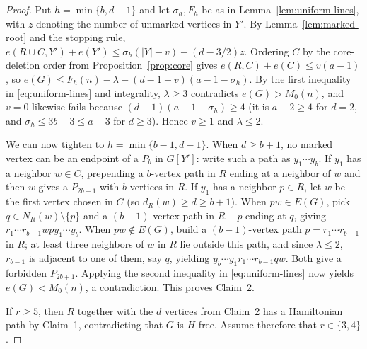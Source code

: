 \documentclass[10pt]{article}
\theoremstyle{compactplain}
\theoremstyle{remark}\newtheorem{remark}[theorem]{Remark}
\begin{document}
\begin{proof}
Put $h=\min\{b,d-1\}$ and let $\sigma_h,F_h$ be as in
Lemma~\ref{lem:uniform-lines}, with $z$ denoting the number of unmarked
vertices in $Y'$. By Lemma~\ref{lem:marked-root} and the stopping rule,
$e(R\cup C,Y')+e(Y')\le\sigma_h(|Y|-v)-(d-3/2)z$. Ordering $C$ by the
core-deletion order from Proposition~\ref{prop:core} gives
$e(R,C)+e(C)\le v(a-1)$, so
$e(G)\le F_h(n)-\lambda-(d-1-v)(a-1-\sigma_h)$. By the first inequality
in \eqref{eq:uniform-lines} and integrality, $\lambda\ge3$ contradicts
$e(G)>M_0(n)$, and $v=0$ likewise fails because
$(d-1)(a-1-\sigma_h)\ge4$ (it is $a-2\ge4$ for $d=2$, and
$\sigma_h\le3b-3\le a-3$ for $d\ge3$). Hence $v\ge1$ and $\lambda\le2$.

We can now tighten to $h=\min\{b-1,d-1\}$. When $d\ge b+1$, no marked
vertex can be an endpoint of a $P_b$ in $G[Y']$: write such a path as
$y_1\cdots y_b$. If $y_1$ has a neighbor $w\in C$, prepending a
$b$-vertex path in $R$ ending at a neighbor of $w$ and then $w$ gives a
$P_{2b+1}$ with $b$ vertices in $R$. If $y_1$ has a neighbor $p\in R$,
let $w$ be the first vertex chosen in $C$ (so $d_R(w)\ge d\ge b+1$).
When $pw\in E(G)$, pick $q\in N_R(w)\setminus\{p\}$ and a $(b-1)$-vertex
path in $R-p$ ending at $q$, giving $r_1\cdots r_{b-1}wpy_1\cdots y_b$.
When $pw\notin E(G)$, build a $(b-1)$-vertex path $p=r_1\cdots r_{b-1}$
in $R$; at least three neighbors of $w$ in $R$ lie outside this path,
and since $\lambda\le2$, $r_{b-1}$ is adjacent to one of them, say $q$,
yielding $y_b\cdots y_1r_1\cdots r_{b-1}qw$. Both give a forbidden
$P_{2b+1}$. Applying the second inequality in \eqref{eq:uniform-lines}
now yields $e(G)<M_0(n)$, a contradiction. This proves Claim~2.

If $r\ge5$, then $R$ together with the $d$ vertices from Claim~2 has a
Hamiltonian path by Claim~1, contradicting that $G$ is $H$-free. Assume
therefore that $r\in\{3,4\}$.


\end{proof}
\end{document}
